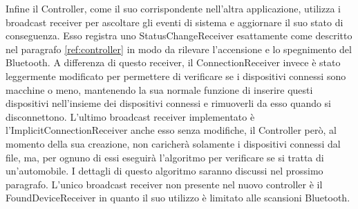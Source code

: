 Infine il Controller, come il suo corrispondente nell'altra applicazione, utilizza i broadcast receiver per ascoltare gli eventi di sistema e aggiornare il suo stato di conseguenza. Esso registra uno StatusChangeReceiver esattamente come descritto nel paragrafo \ref{ref:controller} in modo da rilevare l'accensione e lo spegnimento del Bluetooth. A differenza di questo receiver, il ConnectionReceiver invece è stato leggermente modificato per permettere di verificare se i dispositivi connessi sono macchine o meno, mantenendo la sua normale funzione di inserire questi dispositivi nell'insieme dei dispositivi connessi e rimuoverli da esso quando si disconnettono. L'ultimo broadcast receiver implementato è l'ImplicitConnectionReceiver anche esso senza modifiche, il Controller però, al momento della sua creazione, non caricherà solamente i dispositivi connessi dal file, ma, per ognuno di essi eseguirà l'algoritmo per verificare se si tratta di un'automobile. I dettagli di questo algoritmo saranno discussi nel prossimo paragrafo. L'unico broadcast receiver non presente nel nuovo controller è il FoundDeviceReceiver in quanto il suo utilizzo è limitato alle scansioni Bluetooth.

